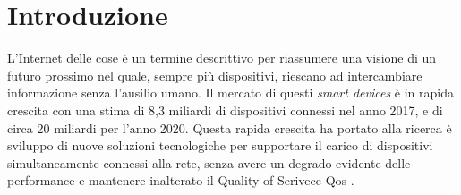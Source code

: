 \chapter*{Introduzione}

L'Internet delle cose è un termine descrittivo per riassumere una visione di
un futuro prossimo nel quale, sempre più dispositivi, riescano ad intercambiare
informazione senza l'ausilio umano. Il mercato di questi \emph{smart devices } è
in rapida crescita con una stima di 8,3 miliardi di dispositivi connessi nel
anno 2017, e di circa 20 miliardi per l'anno 2020. Questa rapida crescita ha
portato alla ricerca è sviluppo di nuove soluzioni tecnologiche per supportare
il carico di dispositivi simultaneamente connessi alla rete, senza avere un
degrado evidente delle performance e mantenere inalterato il Quality of Serivece
Qos \cite{blackholes}. 
